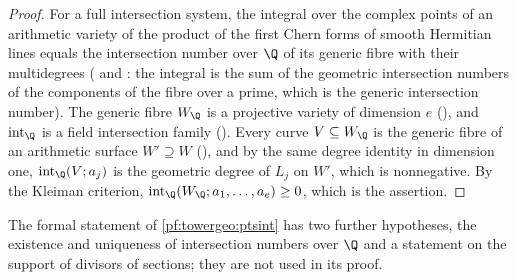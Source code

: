 \begin{proof}
For a full intersection system, the integral over the complex points of an arithmetic variety of the
product of the first Chern forms of smooth Hermitian lines equals the intersection number over $\Q$ of
its generic fibre with their multidegrees (
and : the integral is the sum of the
geometric intersection numbers of the components of the fibre over a prime, which is the generic
intersection number). The generic fibre $W_\Q$ is a projective variety of dimension $e$
(), and
$\mathrm{int}_\Q$ is a field intersection family
(). Every curve
$V\subseteq W_\Q$ is the generic fibre of an arithmetic surface $W'\supseteq W$
(),
and by the same degree identity in dimension one, $\mathrm{int}_\Q(V;a_j)$ is the geometric degree of $L_j$
on $W'$, which is nonnegative. By the Kleiman criterion,
$\mathrm{int}_\Q(W_\Q;a_1,\dots,a_e)\ge0$, which is the assertion.
\end{proof}

\begin{remark}\label{pf:towergeo:rem-aux}
The formal statement of \cref{pf:towergeo:ptsint} has two further hypotheses, the existence and uniqueness
of intersection numbers over $\Q$ and a statement on the support of divisors of sections; they are not
used in its proof.
\end{remark}

